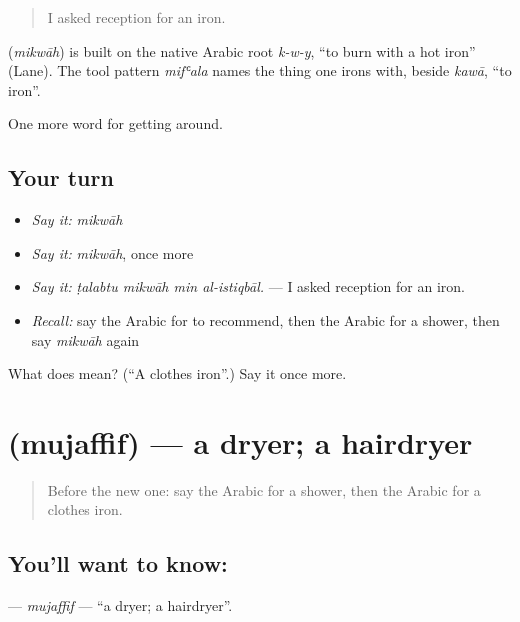 \begin{quote}
I asked reception for an iron.
\end{quote}

\begin{cousinweb}
\textbf{} (\emph{mikwāh}) is built on the native Arabic root \emph{k-w-y}, \textquotedblleft{}to burn with a hot iron\textquotedblright{} (Lane). The tool pattern \emph{mifʿala} names the thing one irons with, beside \emph{kawā}, \textquotedblleft{}to iron\textquotedblright{}.
\end{cousinweb}

\begin{grammarlens}[title={What you've built}]
One more word for getting around.
\end{grammarlens}

\subsection*{Your turn}
\begin{itemize}
\raggedright
  \item \emph{Say it:} \emph{mikwāh}
  \item \emph{Say it:} \emph{mikwāh}, once more
  \item \emph{Say it:} \emph{ṭalabtu mikwāh min al-istiqbāl.} — I asked reception for an iron.
  \item \emph{Recall:} say the Arabic for to recommend, then the Arabic for a shower, then say \emph{mikwāh} again
\end{itemize}

\begin{tcolorbox}[breakable,colback=teal!4,colframe=teal!35!black,title={Before you move on}]
What does  mean? (\textquotedblleft{}A clothes iron\textquotedblright{}.) Say it once more.
\end{tcolorbox}
\section[\texorpdfstring{\ar{مجفف} (mujaffif)}{مجفف (mujaffif)}]{ (mujaffif) — a dryer; a hairdryer}

\label{lesson:AR-C447-mujaffif}



\begin{quote}
Before the new one: say the Arabic for a shower, then the Arabic for a clothes iron.
\end{quote}

\subsection*{You'll want to know: }
\textbf{} — \emph{mujaffif} — \textquotedblleft{}a dryer; a hairdryer\textquotedblright{}.

